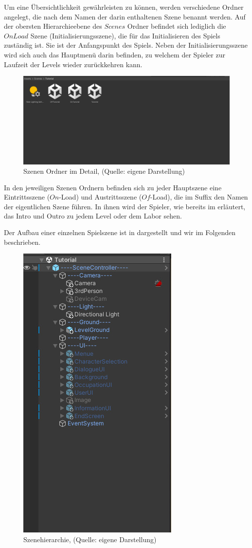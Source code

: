 Um eine Übersichtlichkeit gewährleisten zu können, werden verschiedene Ordner angelegt, die nach dem Namen der darin enthaltenen Szene benannt werden. Auf der obersten Hierarchieebene des $Scenes$ Ordner befindet sich lediglich die $OnLoad$ Szene (Initialisierungsszene), die für das Initialisieren des Spiels zuständig ist. Sie ist der Anfangspunkt des Spiels. Neben der Initialisierungsszene wird sich auch das Hauptmenü darin befinden, zu welchem der Spieler zur Laufzeit der Levels wieder zurückkehren kann. 

\begin{figure}[ht]
\centering
\includegraphics[width=1\linewidth]{content/pictures/Detail.jpg}
\caption{Szenen Ordner im Detail, (Quelle: eigene Darstellung)}
\label{fig:scenes_detail}
\end{figure}

In den jeweiligen Szenen Ordnern befinden sich zu jeder Hauptszene eine Eintrittsszene ($On$-Load) und Austrittsszene ($Of$-Load), die im Suffix den Namen der eigentlichen Szene führen. In ihnen wird der Spieler, wie bereits im  erläutert, das Intro und Outro zu jedem Level oder dem Labor sehen.

Der Aufbau einer einzelnen Spielszene ist in  dargestellt und wir im Folgenden beschrieben.
\begin{figure}[ht]
\centering
\includegraphics[width=0.3\linewidth]{content/pictures/Hierachie.jpg}
\caption{Szenehierarchie, (Quelle: eigene Darstellung)}
\label{fig:scenes_hierachy}
\end{figure}

